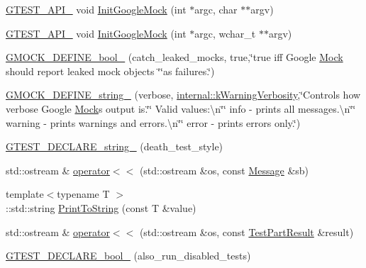 \begin{DoxyCompactItemize}
\hyperlink{gtest-port_8h_aa73be6f0ba4a7456180a94904ce17790}{G\+T\+E\+S\+T\+\_\+\+A\+P\+I\+\_\+} void \hyperlink{namespacetesting_a32b1c6db9ba5133ccabfa67616b3c041}{Init\+Google\+Mock} (int $\ast$argc, char $\ast$$\ast$argv)
\item 
\hyperlink{gtest-port_8h_aa73be6f0ba4a7456180a94904ce17790}{G\+T\+E\+S\+T\+\_\+\+A\+P\+I\+\_\+} void \hyperlink{namespacetesting_a20fb86152763dddef67bc1dd8b090800}{Init\+Google\+Mock} (int $\ast$argc, wchar\+\_\+t $\ast$$\ast$argv)
\item 
\hyperlink{namespacetesting_ac4efd3cec9fd78f180d825c1d178b970}{G\+M\+O\+C\+K\+\_\+\+D\+E\+F\+I\+N\+E\+\_\+bool\+\_\+} (catch\+\_\+leaked\+\_\+mocks, true,\char`\"{}true iff Google \hyperlink{classtesting_1_1Mock}{Mock} should report leaked mock objects \char`\"{}\char`\"{}as failures.\char`\"{})
\item 
\hyperlink{namespacetesting_a17cbc94a0a3ef8fdf7d58fc5dcdcce2a}{G\+M\+O\+C\+K\+\_\+\+D\+E\+F\+I\+N\+E\+\_\+string\+\_\+} (verbose, \hyperlink{namespacetesting_1_1internal_ad9386ccda6b6deac2f7b84784d3088c0}{internal\+::k\+Warning\+Verbosity},\char`\"{}Controls how verbose Google \hyperlink{classtesting_1_1Mock}{Mock}\textquotesingle{}s output is.\char`\"{}\char`\"{}  Valid values\+:\textbackslash{}n\char`\"{}\char`\"{}  info    -\/ prints all messages.\textbackslash{}n\char`\"{}\char`\"{}  warning -\/ prints warnings and errors.\textbackslash{}n\char`\"{}\char`\"{}  error   -\/ prints errors only.\char`\"{})
\item 
\hyperlink{namespacetesting_a37b7e87f0a5f502c6918f37d1768c1f3}{G\+T\+E\+S\+T\+\_\+\+D\+E\+C\+L\+A\+R\+E\+\_\+string\+\_\+} (death\+\_\+test\+\_\+style)
\item 
std\+::ostream \& \hyperlink{namespacetesting_a7b802e532fd68749765cb7dc156130db}{operator$<$$<$} (std\+::ostream \&os, const \hyperlink{classtesting_1_1Message}{Message} \&sb)
\item 
{\footnotesize template$<$typename T $>$ }\\\+::std\+::string \hyperlink{namespacetesting_aa5717bb1144edd1d262d310ba70c82ed}{Print\+To\+String} (const T \&value)
\item 
std\+::ostream \& \hyperlink{namespacetesting_a7c88897836b9f492190fb2b9dfa3a327}{operator$<$$<$} (std\+::ostream \&os, const \hyperlink{classtesting_1_1TestPartResult}{Test\+Part\+Result} \&result)
\item 
\hyperlink{namespacetesting_a4c08ba9fcb0581c61e25968e520efa48}{G\+T\+E\+S\+T\+\_\+\+D\+E\+C\+L\+A\+R\+E\+\_\+bool\+\_\+} (also\+\_\+run\+\_\+disabled\+\_\+tests)

\end{DoxyCompactItemize}
